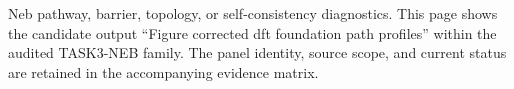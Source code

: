 Neb pathway, barrier, topology, or self-consistency diagnostics. This page shows the candidate output ``Figure corrected dft foundation path profiles'' within the audited TASK3-NEB family. The panel identity, source scope, and current status are retained in the accompanying evidence matrix.
